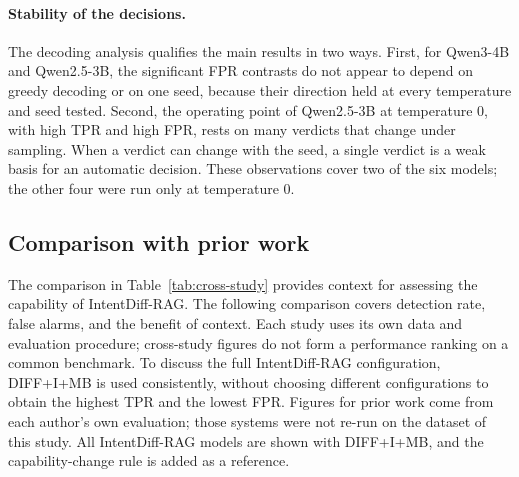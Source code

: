 \documentclass[a4paper,fleqn]{cas-dc}
\begin{document}
\paragraph{Stability of the decisions.}
The decoding analysis qualifies the main results in two ways. First, for
Qwen3-4B and Qwen2.5-3B, the significant FPR contrasts do not appear to depend on
greedy decoding or on one seed, because their direction held at every
temperature and seed tested. Second, the operating point of Qwen2.5-3B at
temperature 0, with high TPR and high FPR, rests on many verdicts that change
under sampling. When a verdict can change with the seed, a single verdict is a
weak basis for an automatic decision. These observations cover two of the six
models; the other four were run only at temperature 0.

\subsection{Comparison with prior work}\label{sec:prior}
The comparison in Table~\ref{tab:cross-study} provides context for assessing the
capability of IntentDiff-RAG. The following comparison covers detection rate,
false alarms, and the benefit of context. Each study uses its own data and
evaluation procedure; cross-study figures do not form a performance ranking on a
common benchmark. To discuss the full IntentDiff-RAG configuration, DIFF+I+MB is
used consistently, without choosing different configurations to obtain the
highest TPR and the lowest FPR. Figures for prior work come from each author's own evaluation; those systems
were not re-run on the dataset of this study. All IntentDiff-RAG models are shown
with DIFF+I+MB, and the capability-change rule is added as a reference.
\end{document}
